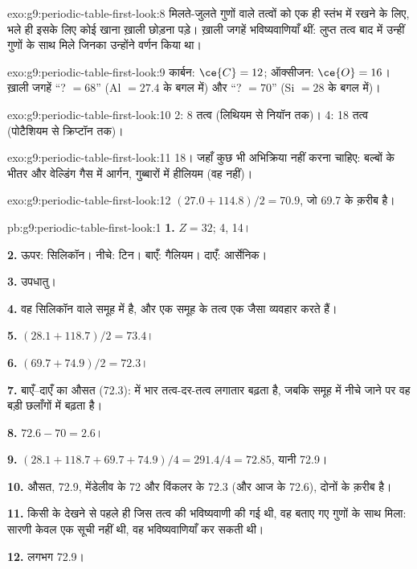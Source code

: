\begin{solution}{exo:g9:periodic-table-first-look:8}
मिलते-जुलते गुणों वाले तत्वों को एक ही स्तंभ में रखने के लिए, भले ही इसके लिए
कोई खाना ख़ाली छोड़ना पड़े। ख़ाली जगहें भविष्यवाणियाँ थीं: लुप्त तत्व बाद में उन्हीं
गुणों के साथ मिले जिनका उन्होंने वर्णन किया था।
\end{solution}

\begin{solution}{exo:g9:periodic-table-first-look:9}
कार्बन: $\ce{C} = 12$; ऑक्सीजन: $\ce{O} = 16$। ख़ाली जगहें ``? $= 68$''
(Al $= 27.4$ के बगल में) और ``? $= 70$'' (Si $= 28$ के बगल में)।
\end{solution}

\begin{solution}{exo:g9:periodic-table-first-look:10}
 2: 8 तत्व (लिथियम से नियॉन तक)।  4: 18 तत्व (पोटैशियम से
क्रिप्टॉन तक)।
\end{solution}

\begin{solution}{exo:g9:periodic-table-first-look:11}
 18। जहाँ कुछ भी अभिक्रिया नहीं करना चाहिए: बल्बों के भीतर और वेल्डिंग गैस
में आर्गन, गुब्बारों में हीलियम (वह  नहीं)।
\end{solution}

\begin{solution}{exo:g9:periodic-table-first-look:12}
$(27.0 + 114.8)/2 = 70.9$, जो 69.7 के क़रीब है।
\end{solution}

\begin{solution}{pb:g9:periodic-table-first-look:1}
\textbf{1.} $Z = 32$;  4,  14।

\textbf{2.} ऊपर: सिलिकॉन। नीचे: टिन। बाएँ: गैलियम। दाएँ: आर्सेनिक।

\textbf{3.} उपधातु।

\textbf{4.} वह सिलिकॉन वाले समूह में है, और एक समूह के तत्व एक जैसा
व्यवहार करते हैं।

\textbf{5.} $(28.1 + 118.7)/2 = 73.4$।

\textbf{6.} $(69.7 + 74.9)/2 = 72.3$।

\textbf{7.} बाएँ--दाएँ का औसत (72.3):  में  भार तत्व-दर-तत्व
लगातार बढ़ता है, जबकि समूह में नीचे जाने पर वह बड़ी छलाँगों में
बढ़ता है।

\textbf{8.} $72.6 - 70 = 2.6$।

\textbf{9.} $(28.1 + 118.7 + 69.7 + 74.9)/4 = 291.4/4 = 72.85$, यानी
72.9।

\textbf{10.} औसत, 72.9, मेंडेलीव के 72 और विंकलर के 72.3 (और आज के
72.6), दोनों के क़रीब है।

\textbf{11.} किसी के देखने से पहले ही जिस तत्व की भविष्यवाणी की गई थी, वह बताए गए
गुणों के साथ मिला: सारणी केवल एक सूची नहीं थी, वह भविष्यवाणियाँ
कर सकती थी।

\textbf{12.} लगभग 72.9।
\end{solution}
